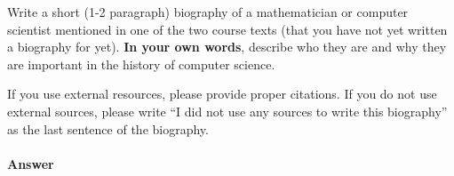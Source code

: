 \documentclass{article}
\begin{document}


\collab{\todo{}}

Write a short (1-2 paragraph) biography of a mathematician or computer scientist
mentioned in one of the two course texts (that you have not yet written a
biography for yet).
\textbf{In your own words}, describe who they are and why they are important in
the history of computer science.

If you use external resources, please provide
proper citations. If you do not use external sources, please write ``I did not
use any sources to write this biography'' as the last sentence of the
biography.

\paragraph{Answer}


% 
% 
\end{document}
